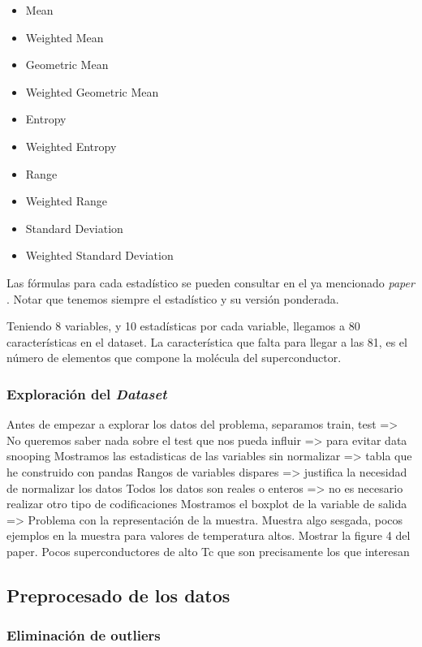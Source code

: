 \documentclass[11pt]{article}
\begin{document}
\begin{itemize}
    \item Mean
    \item Weighted Mean
    \item Geometric Mean
    \item Weighted Geometric Mean
    \item Entropy
    \item Weighted Entropy
    \item Range
    \item Weighted Range
    \item Standard Deviation
    \item Weighted Standard Deviation
\end{itemize}

Las fórmulas para cada estadístico se pueden consultar en el ya mencionado \emph{paper} \cite{original_paper_reg:paper}. Notar que tenemos siempre el estadístico y su versión ponderada.

Teniendo 8 variables, y 10 estadísticas por cada variable, llegamos a 80 características en el dataset. La característica que falta para llegar a las 81, es el número de elementos que compone la molécula del superconductor.

\subsubsection{Exploración del \emph{Dataset}}

Antes de empezar a explorar los datos del problema, separamos train, test => No queremos saber nada sobre el test que nos pueda influir => para evitar data snooping
Mostramos las estadisticas de las variables sin normalizar => tabla que he construido con pandas
Rangos de variables dispares => justifica la necesidad de normalizar los datos
Todos los datos son reales o enteros => no es necesario realizar otro tipo de codificaciones
Mostramos el boxplot de la variable de salida => Problema con la representación de la muestra. Muestra algo sesgada, pocos ejemplos en la muestra para valores de temperatura altos. Mostrar la figure 4 del paper. Pocos superconductores de alto Tc que son precisamente los que interesan

\subsection{Preprocesado de los datos}

\subsubsection{Eliminación de outliers}
\end{document}

